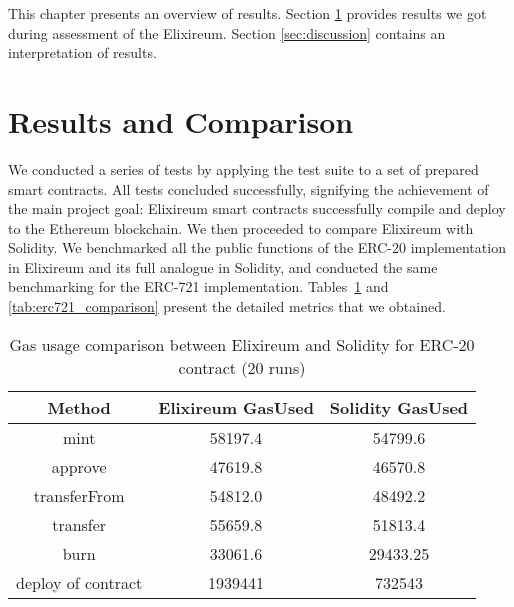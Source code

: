 This chapter presents an overview of results. Section \ref{sec:results_and_comparison} provides results we got during assessment of the Elixireum. Section \ref{sec:discussion} contains an interpretation of results.

\section{Results and Comparison}
\label{sec:results_and_comparison}
We conducted a series of tests by applying the test suite to a set of prepared smart contracts. All tests concluded successfully, signifying the achievement of the main project goal: Elixireum smart contracts successfully compile and deploy to the Ethereum blockchain. We then proceeded to compare Elixireum with Solidity. We benchmarked all the public functions of the ERC-20 implementation in Elixireum and its full analogue in Solidity, and conducted the same benchmarking for the ERC-721 implementation. Tables~\ref{tab:erc20_comparison} and \ref{tab:erc721_comparison} present the detailed metrics that we obtained.


\begin{table}[h!]
  \centering
  \renewcommand{\arraystretch}{1.2}
  \begin{tabular}{|c|c|c|}
  \hline
  \textbf{Method} & \textbf{Elixireum GasUsed} & \textbf{Solidity GasUsed} \\ \hline
  mint            & 58197.4              & 54799.6              \\ \hline
  approve         & 47619.8              & 46570.8              \\ \hline
  transferFrom    & 54812.0              & 48492.2              \\ \hline
  transfer        & 55659.8              & 51813.4              \\ \hline
  burn            & 33061.6              & 29433.25             \\ \hline
  deploy of contract       & 1939441              & 732543               \\ \hline
  \end{tabular}
  \caption{Gas usage comparison between Elixireum and Solidity for ERC-20 contract (20 runs)}
  \label{tab:erc20_comparison}
  \end{table}

